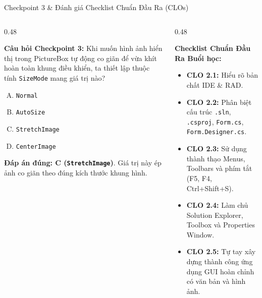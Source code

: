 \documentclass[aspectratio=169, 10pt]{beamer}
\begin{document}
\begin{frame}{Checkpoint 3 \& Đánh giá Checklist Chuẩn Đầu Ra (CLOs)}
  \begin{columns}[T]
    \begin{column}{0.48\textwidth}
      \begin{alertblock}{\textbf{Câu hỏi Checkpoint 3:}}
        Khi muốn hình ảnh hiển thị trong PictureBox tự động co giãn để vừa khít hoàn toàn khung điều khiển, ta thiết lập thuộc tính \texttt{SizeMode} mang giá trị nào?
        \begin{enumerate}[(A)]
          \item \texttt{Normal}
          \item \texttt{AutoSize}
          \item \texttt{StretchImage}
          \item \texttt{CenterImage}
        \end{enumerate}
      \end{alertblock}
      \pause
      \footnotesize \textbf{Đáp án đúng: C (\texttt{StretchImage})}. Giá trị này ép ảnh co giãn theo đúng kích thước khung hình.
    \end{column}

    \begin{column}{0.48\textwidth}
      \begin{exampleblock}{\textbf{Checklist Chuẩn Đầu Ra Buổi học:}}
        \begin{itemize}\footnotesize
          \item[$\boxtimes$] \textbf{CLO 2.1:} Hiểu rõ bản chất IDE \& RAD.
          \item[$\boxtimes$] \textbf{CLO 2.2:} Phân biệt cấu trúc \texttt{.sln}, \texttt{.csproj}, \texttt{Form.cs}, \texttt{Form.Designer.cs}.
          \item[$\boxtimes$] \textbf{CLO 2.3:} Sử dụng thành thạo Menus, Toolbars và phím tắt (F5, F4, Ctrl+Shift+S).
          \item[$\boxtimes$] \textbf{CLO 2.4:} Làm chủ Solution Explorer, Toolbox và Properties Window.
          \item[$\boxtimes$] \textbf{CLO 2.5:} Tự tay xây dựng thành công ứng dụng GUI hoàn chỉnh có văn bản và hình ảnh.
        \end{itemize}
      \end{exampleblock}
    \end{column}
  \end{columns}
\end{frame}
\end{document}
